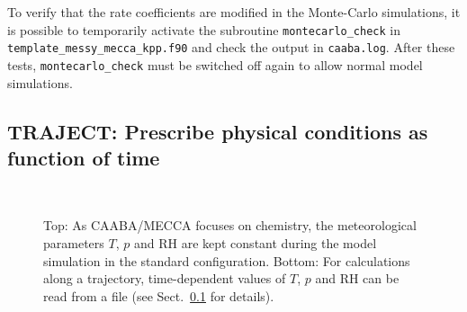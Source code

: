 \documentclass[a4paper,twoside]{article}
\newcommand{\I}[1]{\index{#1}}
\begin{document}
To verify that the rate coefficients are modified in the Monte-Carlo
simulations, it is possible to temporarily activate the subroutine
\verb|montecarlo_check| in \verb|template_messy_mecca_kpp.f90| and check
the output in \verb|caaba.log|. After these tests,
\verb|montecarlo_check| must be switched off again to allow normal model
simulations.

\subsection{\I{Lagrangian}TRAJECT: Prescribe physical conditions as
  function of time}
\label{sec:lagrangian}

\begin{figure}%
  \begin{center}
    \\[3mm]
  \end{center}
  \caption{Top: As CAABA/MECCA focuses on chemistry, the meteorological
    parameters $T$, $p$ and RH are kept constant during the model
    simulation in the standard configuration. Bottom: For calculations
    along a trajectory, time-dependent values of $T$, $p$ and RH can be
    read from a file (see Sect.~\ref{sec:lagrangian} for details).}
  \label{fig:box_model}
\end{figure}
\end{document}
